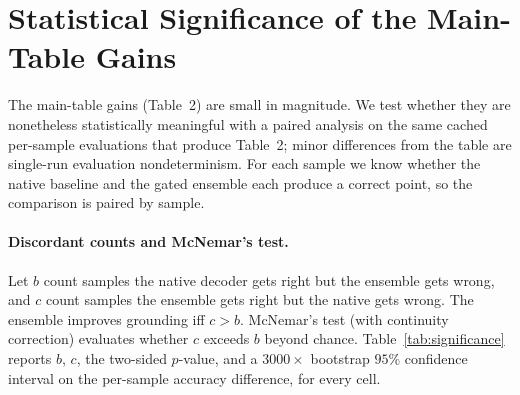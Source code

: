 \section{Statistical Significance of the Main-Table Gains}
\label{app:significance}

The main-table gains (Table~2) are small in magnitude. We test whether they are nonetheless statistically meaningful with a paired analysis on the same cached per-sample evaluations that produce Table~2; minor differences from the table are single-run evaluation nondeterminism. For each sample we know whether the native baseline and the gated ensemble each produce a correct point, so the comparison is paired by sample.

\paragraph{Discordant counts and McNemar's test.}
Let $b$ count samples the native decoder gets right but the ensemble gets wrong, and $c$ count samples the ensemble gets right but the native gets wrong. The ensemble improves grounding iff $c>b$. McNemar's test (with continuity correction) evaluates whether $c$ exceeds $b$ beyond chance. Table~\ref{tab:significance} reports $b$, $c$, the two-sided $p$-value, and a $3000\times$ bootstrap $95\%$ confidence interval on the per-sample accuracy difference, for every cell.


